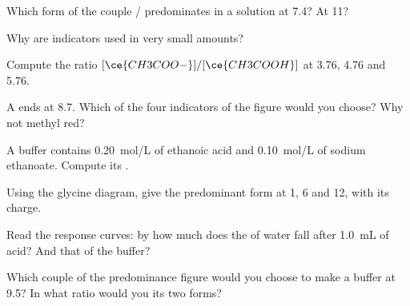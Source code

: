 \begin{exercise}[$\star$]\label{exo:g12:buffers-predominance:4}
Which form of the couple / predominates in a solution at
 7.4? At  11?
\end{exercise}

\begin{exercise}[$\star$]\label{exo:g12:buffers-predominance:5}
Why are indicators used in very small amounts?
\end{exercise}

\begin{exercise}[$\star\star$]\label{exo:g12:buffers-predominance:6}
Compute the ratio $[\ce{CH3COO-}]/[\ce{CH3COOH}]$ at  3.76, 4.76 and
5.76.
\end{exercise}

\begin{exercise}[$\star\star$]\label{exo:g12:buffers-predominance:7}
A  ends at  8.7. Which of the four indicators of the figure
would you choose? Why not methyl red?
\end{exercise}

\begin{exercise}[$\star\star$]\label{exo:g12:buffers-predominance:8}
A buffer contains \qty{0.20}{mol/L} of ethanoic acid and
\qty{0.10}{mol/L} of sodium ethanoate. Compute its .
\end{exercise}

\begin{exercise}[$\star\star$]\label{exo:g12:buffers-predominance:9}
Using the glycine diagram, give the predominant form at  1, 6 and 12,
with its charge.
\end{exercise}

\begin{exercise}[$\star\star$]\label{exo:g12:buffers-predominance:10}
Read the response curves: by how much does the  of water fall after
\qty{1.0}{mL} of acid? And that of the buffer?
\end{exercise}

\begin{exercise}[$\star\star$]\label{exo:g12:buffers-predominance:11}
Which couple of the predominance figure would you choose to make a
buffer at  9.5? In what ratio would you  its two forms?
\end{exercise}

